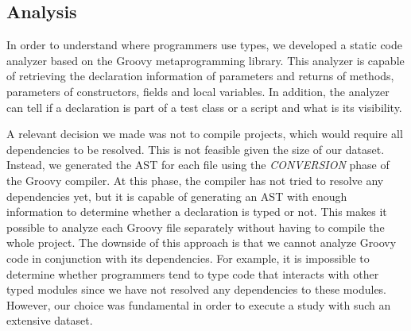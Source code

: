 \documentclass[]{sigplanconf}
\begin{document}





\subsection{Analysis\label{analyzer}}
In order to understand where programmers use types, we developed a static code analyzer based on the Groovy metaprogramming library.
This analyzer is capable of retrieving the declaration information of parameters and returns of methods, parameters of constructors, fields and local variables.
In addition, the analyzer can tell if a declaration is part of a test class or a script and what is its visibility.

A relevant decision we made was not to compile projects, which would require all dependencies to be resolved.
This is not feasible given the size of our dataset.
Instead, we generated the AST for each file using the \emph{CONVERSION} phase of the Groovy compiler.
At this phase, the compiler has not tried to resolve any dependencies yet, but it is capable of generating an AST with enough information to determine whether a declaration is typed or not.
This makes it possible to analyze each Groovy file separately without having to compile the whole project.
The downside of this approach is that we cannot analyze Groovy code in conjunction with its dependencies. 
For example, it is impossible to determine whether programmers tend to type code that interacts with other typed modules since we have not resolved any dependencies to these modules.
However, our choice was fundamental in order to execute a study with such an extensive dataset.
\end{document}

